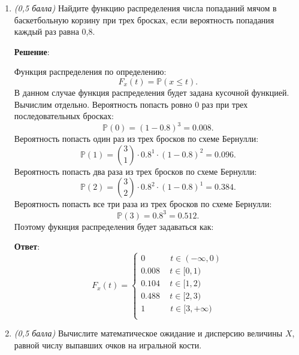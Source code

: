 \documentclass{article}
\begin{document}
\begin{enumerate}

\item \textit{(0,5 балла)} Найдите функцию распределения числа попаданий мячом в баскетбольную корзину при трех бросках, если вероятность попадания каждый раз равна 0,8.

\textbf{Решение}:

Функция распределения по определению:
\begin{equation}
    F_x(t) = \mathbb{P}(x \leq t).
\end{equation}
В данном случае функция распределения будет задана кусочной функцией. Вычислим отдельно. Вероятность попасть ровно 0 раз при трех последовательных бросках:
\begin{equation}
    \mathbb{P}(0) = (1-0.8)^3 = 0.008.
\end{equation}
Вероятность попасть один раз из трех бросков по схеме Бернулли:
\begin{equation}
    \mathbb{P}(1) = \binom{3}{1}\cdot 0.8^1 \cdot (1-0.8)^2 = 0.096.
\end{equation}
Вероятность попасть два раза из трех бросков по схеме Бернулли:
\begin{equation}
    \mathbb{P}(2) = \binom{3}{2}\cdot 0.8^2 \cdot (1-0.8)^1 = 0.384.
\end{equation}
Вероятность попасть все три раза из трех бросков по схеме Бернулли:
\begin{equation}
    \mathbb{P}(3) = 0.8^3 = 0.512.
\end{equation}
Поэтому фукнция распределения будет задаваться как:

\textbf{Ответ}:
\begin{equation}
    F_x(t) = \begin{cases}
        0 \quad \qquad  t \in (-\infty, 0) \\
        0.008 \quad\, t \in [0, 1) \\
        0.104 \quad\, t \in [1, 2) \\
        0.488 \quad\, t \in [2, 3) \\
        1 \quad \qquad  t \in [3, +\infty) \\
    \end{cases}
\end{equation}

\item \textit{(0,5 балла)} Вычислите математическое ожидание и дисперсию величины $X$, равной числу выпавших очков на игральной кости.


\end{enumerate}
\end{document}
